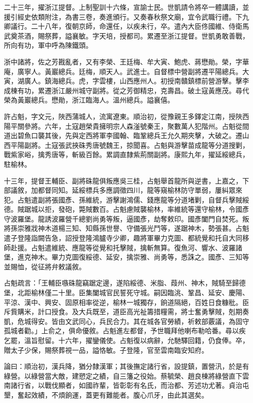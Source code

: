 \begin{pinyinscope}
二十三年，擢浙江提督。上制聖訓十六條，宣諭士民。世凱請令將卒一體講讀，並援引經史依類附注，為書三卷，奏進頒行。又奏春秋祭文廟，宜令武職行禮。下九卿議行。二十八年，復朝京師，命還任，以疾未行，卒。遣內大臣佟國維、侍衛馬武奠茶酒，賜祭葬，謚襄敏。字天培，授都司。累遷至浙江提督。世凱勇敢善戰，所向有功，軍中呼為陳鐵頭。

浙中諸將，佐之芳戡亂者，又有李榮、王廷梅、牟大寅、鮑虎、蔣懋勛。榮，字華庵，廣寧人。黃巖總兵。廷梅，順天人。武進士。自督標中營副將遷平陽總兵。大寅，湖廣人。鎮海總兵。虎，字雲樓，山西應州人。初授南贛鎮標前營游擊。擊李成棟有功，累遷浙江嚴州城守副將。從之芳御精忠，克壽昌。破土寇黃應茂。尋代榮為黃巖總兵。懋勛，浙江臨海人。溫州總兵。謚襄僖。

許占魁，字文元，陜西蒲城人，流寓遼東。順治初，從豫親王多鐸定江南，授陜西陽平關參將。六年，土寇趙榮貴擁明宗人森滏號秦王，聚數萬人犯階州。占魁從間道出碧魚口襲其後，先與定西將軍李國翰、臨鞏總兵王允久期夾擊，大破之。遷山西平陽副將。土寇張武挾硃秀唐號魏王，掠聞喜。占魁與游擊苗成龍等分道搜剿，戰紫家峪，擒秀唐等，斬級百餘。累調直隸紫荊關副將。康熙九年，擢延綏總兵，駐榆林。

十三年，提督王輔臣、副將硃龍俱叛應吳三桂，占魁舉首龍所與逆書，上嘉之，下部議敘，加都督同知。延綏標兵多應調徵四川，龍等窺榆林防守單弱，屢糾眾來犯。占魁遣副將張國彥、孫維統，游擊謝鴻儒、錢應龍等分道堵剿，自督兵擊賊綏德。賊踞城以拒，發砲，斃賊數百。占魁慮賊襲榆林，率維統等還守榆林，令國彥守波羅堡。龍誘波羅營千總劉尚勇等叛，逼國彥，劫奪敕印。國彥闔門自焚死。叛將孫崇雅戕神木道楊三知、知縣孫世譽、守備張光鬥等，遂踞神木，勢張甚。占魁遣子登隆詣闕告急，詔授登隆鴻臚寺少卿，趣將軍畢力克圖、都統覺和托自大同移師赴援。占魁遣維統、應龍等從覺和托擊賊，擒斬無算。復魚河、響水、波羅諸堡，進克神木。畢力克圖復綏德、延安，擒崇雅、尚勇等，悉誅之。國彥、三知等並賜恤，從征將弁敕議敘。

占魁疏言：「王輔臣嗾硃龍竊踞定邊，遂陷綏德、米脂、葭州、神木，賊騎至歸德堡，北距榆林僅二十里。臣集闔城官民誓死守城。嗣因臨洮、鞏昌、延安、慶陽、平涼、漢中、興安、固原相率從逆，榆林一城獨存，餉道隔絕，百姓日食糠秕。臣斥貲購米，計口授食。及大兵既至，道臣高光祉籌措糧需，將士奮勇擊賊，剋期奏凱，危城得安。皆由文武同心，兵民合力。其在城各官勞績，祈敕部覈議，為固守孤城者勸。」上俞之，俱命優敘。占魁進左都督，予世職拜他喇布勒哈番。尋以疾乞罷，溫旨慰留。十六年，擢鑾儀使。占魁復以病辭，允馳驛回籍，仍食俸。卒，贈太子少保，賜祭葬視一品，謚恪敏。子登隆，官至雲南臨安知府。

論曰：順治初，漢兵降，猶分隸漢軍；其後撫定諸行省，設提鎮，置營汛，於是有綠營。以綠營當大敵，建愬定之績，自三籓之役始。蔡毓榮、趙良棟將綠營直下雲南諸行省，以戰伐顯者，如國祚輩，皆彰彰有名氏，而治都、芳述功尤著。貞治屯墾，奮起效績，不煩餉運，蓋更有難能者。腹心爪牙，由此其選矣。


\end{pinyinscope}